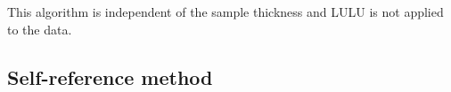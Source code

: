 



This algorithm is independent of the sample thickness and LULU is not applied to the data.

\subsection{Self-reference method}
\label{sub:Self}

